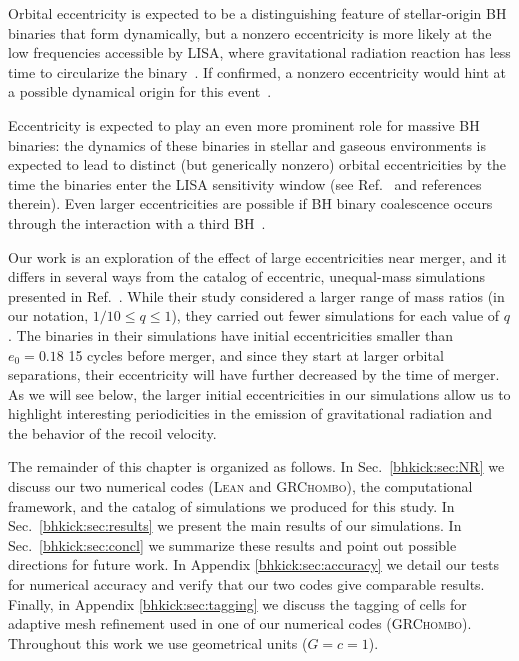 Orbital eccentricity is expected to be a distinguishing feature of
stellar-origin BH binaries that form dynamically, but a nonzero
eccentricity is more likely at the low frequencies accessible by LISA,
where gravitational radiation reaction has less time to circularize
the binary~\cite{Nishizawa:2016jji,Breivik:2016ddj,Nishizawa:2016eza}.
If confirmed, a nonzero eccentricity would hint at a possible
dynamical origin for this event~\cite{Romero-Shaw:2020thy}.

Eccentricity is expected to play an even more prominent role for
massive BH binaries: the dynamics of these binaries in stellar and
gaseous environments is expected to lead to distinct (but generically
nonzero) orbital eccentricities by the time the binaries enter the
LISA sensitivity window (see Ref.~\cite{Roedig:2011rn} and references
therein). Even larger eccentricities are possible if BH binary
coalescence occurs through the interaction with a third
BH~\cite{Bonetti:2018tpf}.

Our work is an exploration of the effect of large eccentricities near
merger, and it differs in several ways from the catalog of eccentric,
unequal-mass simulations presented in Ref.~\cite{Huerta:2019oxn}.
While their study considered a larger range of mass ratios (in our
notation, $1/10\leq q\leq 1$), they carried out fewer simulations for
each value of $q$. The binaries in their simulations have initial
eccentricities smaller than $e_0 = 0.18$ 15 cycles before merger,
and since they start at larger orbital separations,
their eccentricity will have further decreased by the time of merger.
As we will see below, the larger initial eccentricities in
our simulations allow us to highlight interesting periodicities in the
emission of gravitational radiation and the behavior of the recoil
velocity.

The remainder of this chapter is organized as follows.
%
In Sec.~\ref{bhkick:sec:NR} we discuss our two numerical codes (\textsc{Lean}
and \textsc{GRChombo}), the computational framework, and the catalog
of simulations we produced for this study. In Sec.~\ref{bhkick:sec:results}
we present the main results of our simulations. In
Sec.~\ref{bhkick:sec:concl} we summarize these results and point out possible
directions for future work. In Appendix \ref{bhkick:sec:accuracy} we
detail our tests for numerical accuracy and verify that
our two codes give comparable results.
Finally, in Appendix \ref{bhkick:sec:tagging} we 
discuss the tagging of cells for adaptive mesh refinement used in one
of our numerical codes (\textsc{GRChombo}).
%
Throughout this work we use geometrical units ($G=c=1$).

